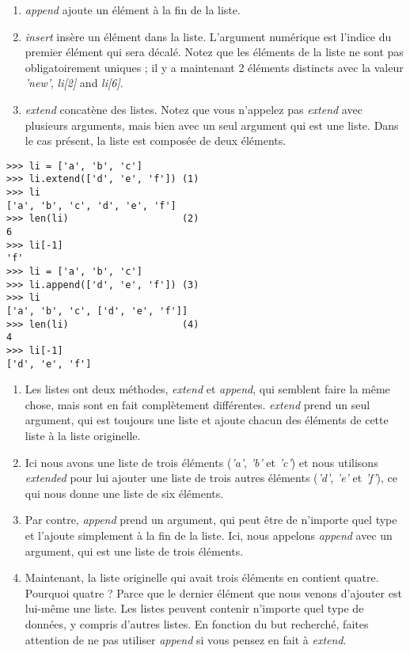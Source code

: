 \begin{enumerate}
\item{\emph{append} ajoute un élément à la fin de la liste.}
\item{\emph{insert} insère un élément dans la liste. L'argument numérique est l'indice du premier élément qui sera décalé. Notez que les éléments de la liste ne sont pas obligatoirement uniques ; il y a maintenant 2 éléments distincts avec la valeur \emph{'new'},  \emph{li[2]} and  \emph{li[6]}.}
\item{\emph{extend} concatène des listes. Notez que vous n'appelez pas \emph{extend} avec plusieurs arguments, mais bien avec un seul argument qui est une liste. Dans le cas présent, la liste est composée de deux éléments.}
\end{enumerate}

\begin{example}
\begin{lstlisting}
>>> li = ['a', 'b', 'c']
>>> li.extend(['d', 'e', 'f']) (1)
>>> li
['a', 'b', 'c', 'd', 'e', 'f']
>>> len(li)                    (2)
6
>>> li[-1]
'f'
>>> li = ['a', 'b', 'c']
>>> li.append(['d', 'e', 'f']) (3)
>>> li
['a', 'b', 'c', ['d', 'e', 'f']]
>>> len(li)                    (4)
4
>>> li[-1]
['d', 'e', 'f']
\end{lstlisting}
\end{example}

\begin{enumerate}
\item {Les listes ont deux méthodes, \emph{extend} et \emph{append}, qui semblent faire la même chose, mais sont en fait complètement différentes. \emph{extend} prend un seul argument, qui est toujours une liste et ajoute chacun des éléments de cette liste à la liste originelle.}
\item {Ici nous avons une liste de trois éléments (\emph{'a'}, \emph{'b'} et \emph{'c'}) et nous utilisons \emph{extended} pour lui ajouter une liste de trois autres éléments (\emph{'d'}, \emph{'e'} et \emph{'f'}), ce qui nous donne une liste de six éléments.}
\item {Par contre, \emph{append} prend un argument, qui peut être de n'importe quel type et l'ajoute simplement à la fin de la liste. Ici, nous appelons \emph{append} avec un argument, qui est une liste de trois éléments.}
\item {Maintenant, la liste originelle qui avait trois éléments en contient quatre. Pourquoi quatre ? Parce que le dernier élément que nous venons d'ajouter est lui-même une liste. Les listes peuvent contenir n'importe quel type de données, y compris d'autres listes. En fonction du but recherché, faites attention de ne pas utiliser \emph{append} si vous pensez en fait à \emph{extend}.}
\end{enumerate}

